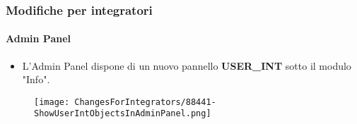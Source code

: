 
\begin{frame}[fragile]
	\frametitle{Modifiche per integratori}
	\framesubtitle{Admin Panel}

	\begin{itemize}
		\item L'Admin Panel dispone di un nuovo pannello \textbf{USER\_INT} sotto il modulo "Info".
	\end{itemize}

	\begin{figure}
		\texttt{[image: ChangesForIntegrators/88441-ShowUserIntObjectsInAdminPanel.png]}
	\end{figure}

\end{frame}

